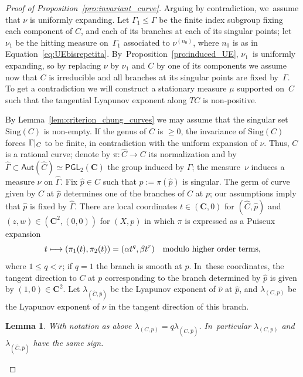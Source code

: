 \documentclass[11pt]{article}
\newcommand\mto{\mathchoice{\longmapsto}{\mapsto}{\mapsto}{\mapsto}}
\newcommand{\rest}[1]{ \arrowvert_{#1}}
\def\C{\mathbf{C}}
\newcommand{\Sing}{{\mathrm{Sing}}}
\newcommand\Aut{\mathsf{Aut}}
\newcommand\PGL{{\mathsf{PGL}}}
\theoremstyle{plain}
\newtheorem{lem}[thm]{Lemma}
\theoremstyle{definition}
\numberwithin{equation}{section}
\begin{document}
\begin{proof}[Proof of Proposition~\ref{pro:invariant_curve}]
Arguing by contradiction, we~assume that $\nu$ is uniformly expanding. Let $\Gamma_1\leq \Gamma$
be the finite index subgroup fixing each component of $C$,
and each of its branches at each of its singular points; let $\nu_1$ be
the hitting measure on~$\Gamma_1$ associated to
$\nu^{(n_0)}$, where $n_0$ is as in Equation~\eqref{eq:UEbisrepetita}. By~Proposition~\ref{pro:induced_UE}, $\nu_1$~is uniformly
expanding, so by replacing $\nu$ by $\nu_1$ and $C$ by one of its components
we assume now that $C$ is irreducible and all branches at its
singular points are fixed by~$\Gamma$. To get a
contradiction we will construct a stationary measure $\mu$ supported on~$C$
such that the tangential Lyapunov exponent along $TC$ is non-positive.

By Lemma~\ref{lem:criterion_chung_curves} we may assume that
the singular set $\Sing(C)$ is non-empty.
If the genus of $C$ is $\geq 0$, the invariance of $\Sing(C)$ forces $\Gamma\rest{C}$ to be finite, in contradiction with the
uniform expansion of $\nu$. Thus, $C$ is a rational curve;
denote by $\pi:\hat C\to C$ its normalization and by $\hat \Gamma\subset \Aut(\hat{C})\simeq \PGL_2(\C)$
the group induced by $\Gamma$; the measure~$\nu$ induces a
measure $\hat \nu$ on $\hat \Gamma$.
Fix $\hat p\in \hat C$ such that $p:=\pi(\hat p)$ is singular. The germ of curve given by $\hat C$ at $\hat p$ determines one of the branches of $C$ at $p$; our assumptions imply that
$\hat p$ is fixed by $\hat\Gamma$. There are local coordinates $t\in (\C,0)$ for $(\hat C, \hat p)$ and $(z,w)\in (\C^2, (0,0))$ for $(X, p)$ in which
$\pi$ is expressed as a Puiseux expansion
\begin{equation*}
t\mto (\pi_1(t), \pi_2(t)) = (\alpha t^q , \beta t^r) \quad\text{modulo higher order terms},
\end{equation*}
where $1\leq q<r$; if $q=1$ the branch is smooth at $p$. In~these coordinates, the tangent direction to $C$ at $p$ corresponding to the branch determined by $\hat p$ is
given by $(1,0)\in \C^2$.
Let $\lambda_{(\hat C, \hat{p})}$ be the
Lyapunov exponent of $\hat \nu$ at $\hat p$, and $\lambda_{(C, p)}$ be the Lyapunov exponent of $\nu$
in the tangent direction of this branch.

\begin{lem}\label{lem:tangent_singular}
With notation as above
$\lambda_{(C, p)} = q \lambda_{(\hat C, \hat{p})}$. In~particular $\lambda_{(C, p)}$ and $\lambda_{(\hat C, \hat{p})}$
have the same sign.
\end{lem}


\end{proof}
\end{document}
